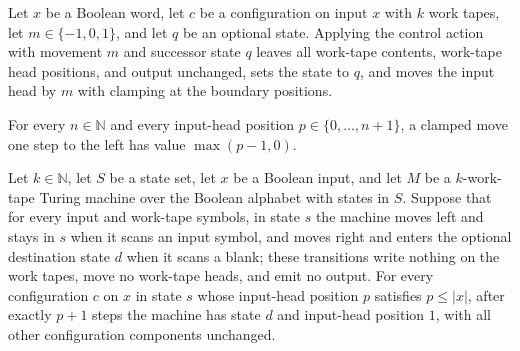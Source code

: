 \begin{lemma}
\label{Turing.FinTM.controlAction_apply}
\leanok
{}
Let $x$ be a Boolean word, let $c$ be a configuration on input $x$ with $k$ work tapes,
let $m\in\{-1,0,1\}$, and let $q$ be an optional state. Applying the control action with
movement $m$ and successor state $q$ leaves all work-tape contents, work-tape head
positions, and output unchanged, sets the state to $q$, and moves the input head by $m$
with clamping at the boundary positions.
\end{lemma}

\begin{lemma}
\label{Turing.FinTM.moveInputPos_neg_val}
\leanok
{}
For every $n\in\mathbb N$ and every input-head position $p\in\{0,\ldots,n+1\}$, a
clamped move one step to the left has value $\max(p-1,0)$.
\end{lemma}

\begin{lemma}
\label{Turing.FinTM.rewind_scan}
\leanok
{}
Let $k \in \mathbb{N}$, let $S$ be a state set, let $x$ be a Boolean input, and let $M$
be a $k$-work-tape Turing machine over the Boolean alphabet with states in $S$. Suppose
that for every input and work-tape symbols, in state $s$ the machine moves left and
stays in $s$ when it scans an input symbol, and moves right and enters the optional
destination state $d$ when it scans a blank; these transitions write nothing on the work
tapes, move no work-tape heads, and emit no output. For every configuration $c$ on $x$
in state $s$ whose input-head position $p$ satisfies $p \le |x|$, after exactly $p+1$
steps the machine has state $d$ and input-head position $1$, with all other
configuration components unchanged.
\end{lemma}

